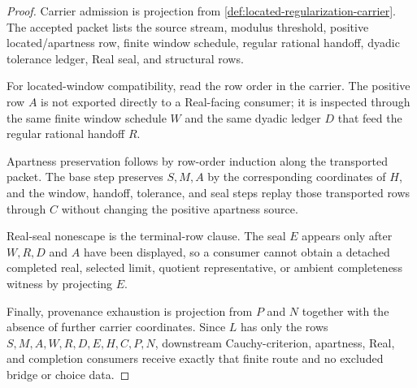\begin{proof}
Carrier admission is projection from \autoref{def:located-regularization-carrier}. The accepted packet lists the source stream, modulus threshold, positive located/apartness row, finite window schedule, regular rational handoff, dyadic tolerance ledger, Real seal, and structural rows.

For located-window compatibility, read the row order in the carrier. The positive row $A$ is not exported directly to a Real-facing consumer; it is inspected through the same finite window schedule $W$ and the same dyadic ledger $D$ that feed the regular rational handoff $R$.

Apartness preservation follows by row-order induction along the transported packet. The base step preserves $S,M,A$ by the corresponding coordinates of $H$, and the window, handoff, tolerance, and seal steps replay those transported rows through $C$ without changing the positive apartness source.

Real-seal nonescape is the terminal-row clause. The seal $E$ appears only after $W,R,D$ and $A$ have been displayed, so a consumer cannot obtain a detached completed real, selected limit, quotient representative, or ambient completeness witness by projecting $E$.

Finally, provenance exhaustion is projection from $P$ and $N$ together with the absence of further carrier coordinates. Since $L$ has only the rows $S,M,A,W,R,D,E,H,C,P,N$, downstream Cauchy-criterion, apartness, Real, and completion consumers receive exactly that finite route and no excluded bridge or choice data.
\end{proof}

